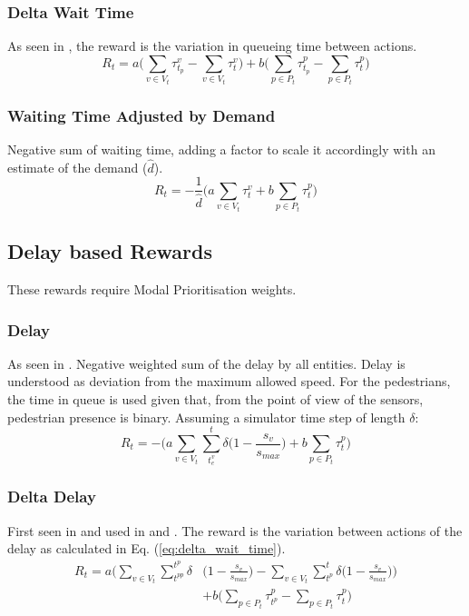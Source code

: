 \documentclass[conference]{IEEEtran}
\begin{document}
\subsubsection{Delta Wait Time}
As seen in \cite{liang2017}, the reward is the variation in queueing time between actions.
\begin{equation}
R_t = a \bigg( \sum_{v \in V_t} \tau^v_{t_p} -  \sum_{v \in V_t} \tau^v_{t} \bigg) + b \bigg( \sum_{p \in P_t} \tau^p_{t_p} -  \sum_{p \in P_t} \tau^p_{t} \bigg)
\label{eq:delta_wait_time}
\end{equation}

\subsubsection{Waiting Time Adjusted by Demand}
Negative sum of waiting time, adding a factor to scale it accordingly with an estimate of the demand ($\hat{d}$).
\begin{equation}
   R_t = -\frac{1}{\hat{d}} \bigg( a \sum_{v \in V_t} \tau^v_{t} + b \sum_{p \in P_t} \tau^p_{t} \bigg)
\label{eq:wait_time_norm} 
\end{equation}

\subsection{Delay based Rewards}
These rewards require Modal Prioritisation weights.
\subsubsection{Delay}
As seen in \cite{wan2018}. Negative weighted sum of the delay by all entities. Delay is understood as deviation from the maximum allowed speed. 
For the pedestrians, the time in queue is used given that, from the point of view of the sensors, pedestrian presence is binary.
Assuming a simulator time step of length $\delta$:
\begin{equation}
    R_t = - \bigg( a \sum_{v \in V_t}  \sum_{t^v_e}^t \delta \big( 1-\frac{s_v}{s_{max}} \big) + b \sum_{p \in P_t} \tau^p_t \bigg)
\label{eq:delay}
\end{equation}

\subsubsection{Delta Delay}
First seen in \cite{abdulhai2010} and used in \cite{genders2016} \cite{gao2017} \cite{mousavi2017} and \cite{gendersstate}.
The reward is the variation between actions of the delay as calculated in Eq. (\ref{eq:delta_wait_time}).
\begin{equation}
\begin{split}
R_t =  a \bigg( \sum_{v \in V_t} \sum_{t^{pp}}^{t^p} \delta & \big( 1-\frac{s_v}{s_{max}} \big) - \sum_{v \in V_t}  \sum_{t^p}^t \delta \big( 1-\frac{s_v}{s_{max}} \big) \bigg) \\
& + b \bigg( \sum_{p \in P_t} \tau^p_{t^p} - \sum_{p \in P_t} \tau^p_{t} \bigg) 
\end{split}
\label{eq:changedelay} 
\end{equation}
\end{document}
